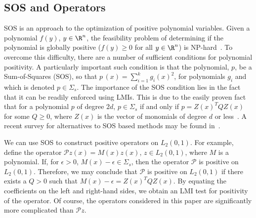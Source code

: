 \documentclass[US letter, 9 pt, conference]{ieeeconf}  \usepackage{setspace}
\newcommand{\lt}{L_2(0,1)}
\newcommand{\pop}{\mathcal{P}}
\begin{document}
\subsection{SOS and Operators}\label{subsec:sos}
SOS is an approach to  the optimization of positive polynomial variables. Given a polynomial $f(y)$, $y\in \R^n$, the feasibility problem of determining if the polynomial is globally positive ($f(y)\ge0$ for all $y\in \R^n$) is NP-hard~\cite{blum1998complexity}. To overcome this difficulty, there are a number of sufficient conditions for polynomial positivity. A particularly important such condition is that the polynomial, $p$, be a Sum-of-Squares (SOS), so that $p\,(x)=\sum_{i=1}^k g_i(x)^2$, for polynomials $g_i$  and which is denoted $p \in\Sigma_s$. The importance of the SOS condition lies in the fact that it can be readily enforced using LMIs. This is due to the easily proven fact that for a polynomial $p$ of degree $2d$, $p \in \Sigma_s$ if and only if $p=Z(x)^T Q Z(x)$ for some $Q\ge 0$, where $Z(x)$ is the vector of monomials of degree $d$ or less~\cite{parrilo2000structured}.  A recent survey for alternatives to SOS based methods may be found in~\cite{kamyar2014polynomial}.

We can use SOS to construct positive operators on $\lt$. For example, define the operator $\pop z(x)=M(x)z(x)$, $z\in \lt$, where $M$ is a polynomial. If, for $\epsilon>0$, $M(x)-\epsilon \in \Sigma_s$, then the operator $\pop$ is positive on $\lt$. Therefore, we may conclude that $\pop$ is positive on $\lt$ if there exists a $Q>0$ such that
 $M(x)-\epsilon=Z(x)^T Q Z(x)$. By equating the coefficients on the left and right-hand sides, we obtain an LMI test for positivity of the operator. Of course, the operators considered in this paper are significantly more complicated than $\pop z$.
\end{document}
